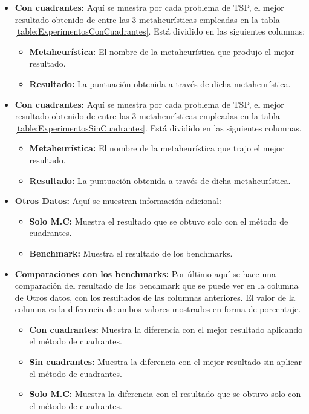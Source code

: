 \begin{itemize}
    \item \textbf{Con cuadrantes: }Aquí se muestra por cada problema de TSP, el mejor resultado obtenido de entre las 3 metaheurísticas empleadas en la tabla \ref{table:ExperimentosConCuadrantes}. Está dividido en las siguientes columnas:
    \begin{itemize}
        \item \textbf{Metaheurística: }El nombre de la metaheurística que produjo el mejor resultado.
        \item \textbf{Resultado: }La puntuación obtenida a través de dicha metaheurística.
    \end{itemize}
    \item \textbf{Con cuadrantes: }Aquí se muestra por cada problema de TSP, el mejor resultado obtenido de entre las 3 metaheurísticas empleadas en la tabla \ref{table:ExperimentosSinCuadrantes}. Está dividido en las siguientes columnas.
    \begin{itemize}
        \item \textbf{Metaheurística: }El nombre de la metaheurística que trajo el mejor resultado.
        \item \textbf{Resultado: }La puntuación obtenida a través de dicha metaheurística.
    \end{itemize}
    \item \textbf{Otros Datos: } Aquí se muestran información adicional:
    \begin{itemize}
        \item \textbf{Solo M.C: }Muestra el resultado que se obtuvo solo con el método de cuadrantes.
        \item \textbf{Benchmark: }Muestra el resultado de los benchmarks.
    \end{itemize}
    \item \textbf{Comparaciones con los benchmarks: } Por último aquí se hace una comparación del resultado de los benchmark que se puede ver en la columna de Otros datos, con los resultados de las columnas anteriores. El valor de la columna es la diferencia de ambos valores mostrados en forma de porcentaje.
    \begin{itemize}
        \item \textbf{Con cuadrantes: }Muestra la diferencia con el mejor resultado aplicando el método de cuadrantes.
        \item \textbf{Sin cuadrantes: }Muestra la diferencia con el mejor resultado sin aplicar el método de cuadrantes.
        \item \textbf{Solo M.C: }Muestra la diferencia con el resultado que se obtuvo solo con el método de cuadrantes.
    \end{itemize}
\end{itemize}
    
 
        
\clearpage \newpage